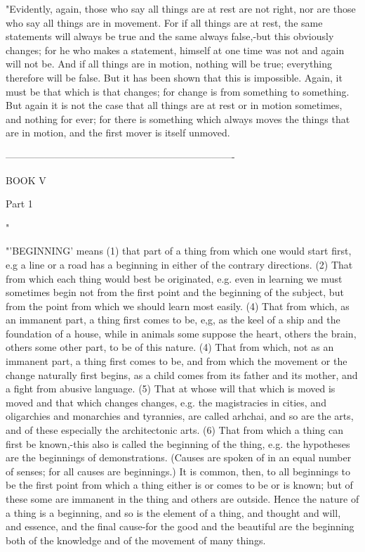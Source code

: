 "Evidently, again, those who say all things are at rest are not right,
nor are those who say all things are in movement. For if all things
are at rest, the same statements will always be true and the same
always false,-but this obviously changes; for he who makes a statement,
himself at one time was not and again will not be. And if all things
are in motion, nothing will be true; everything therefore will be
false. But it has been shown that this is impossible. Again, it must
be that which is that changes; for change is from something to something.
But again it is not the case that all things are at rest or in motion
sometimes, and nothing for ever; for there is something which always
moves the things that are in motion, and the first mover is itself
unmoved. 

----------------------------------------------------------------------

BOOK V

Part 1 

"

"'BEGINNING' means (1) that part of a thing from which one would start
first, e.g a line or a road has a beginning in either of the contrary
directions. (2) That from which each thing would best be originated,
e.g. even in learning we must sometimes begin not from the first point
and the beginning of the subject, but from the point from which we
should learn most easily. (4) That from which, as an immanent part,
a thing first comes to be, e,g, as the keel of a ship and the foundation
of a house, while in animals some suppose the heart, others the brain,
others some other part, to be of this nature. (4) That from which,
not as an immanent part, a thing first comes to be, and from which
the movement or the change naturally first begins, as a child comes
from its father and its mother, and a fight from abusive language.
(5) That at whose will that which is moved is moved and that which
changes changes, e.g. the magistracies in cities, and oligarchies
and monarchies and tyrannies, are called arhchai, and so are the arts,
and of these especially the architectonic arts. (6) That from which
a thing can first be known,-this also is called the beginning of the
thing, e.g. the hypotheses are the beginnings of demonstrations. (Causes
are spoken of in an equal number of senses; for all causes are beginnings.)
It is common, then, to all beginnings to be the first point from which
a thing either is or comes to be or is known; but of these some are
immanent in the thing and others are outside. Hence the nature of
a thing is a beginning, and so is the element of a thing, and thought
and will, and essence, and the final cause-for the good and the beautiful
are the beginning both of the knowledge and of the movement of many
things. 

